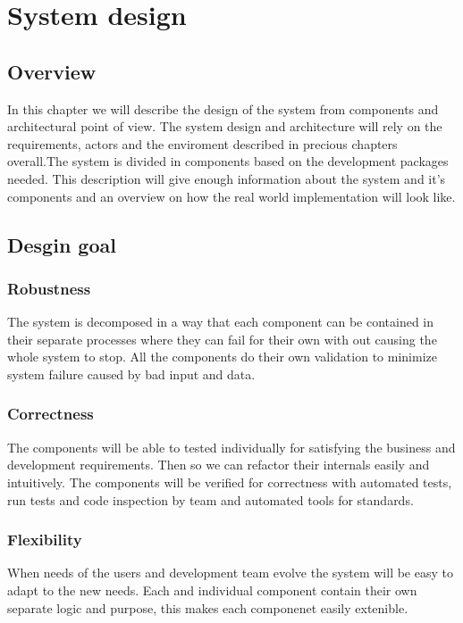 \chapter{System design}
\section{Overview}

In this chapter we will describe the design of the system from components and architectural point of view. The system design and architecture will rely on the requirements, actors and the enviroment described in precious chapters overall.The system is divided in components based on the development packages needed. This description will give enough information about the system and it's components and an overview on how the real world implementation will look like.

\section{Desgin goal}

\subsection{Robustness}
The system is decomposed in a way that each component can be contained in their separate processes where they can fail for their own with out causing the whole system to stop. All the components do their own validation to minimize system failure caused by bad input and data.

\subsection{Correctness}
The components will be able to tested individually for satisfying the business and development requirements. Then so we can refactor their internals easily and intuitively. The components will be verified for correctness with automated tests, run tests and code inspection by team and automated tools for standards.

\subsection{Flexibility}
When needs of the users and development team evolve the system will be easy to adapt to the new needs. Each and individual component contain their own separate logic and purpose, this makes each componenet easily extenible.

